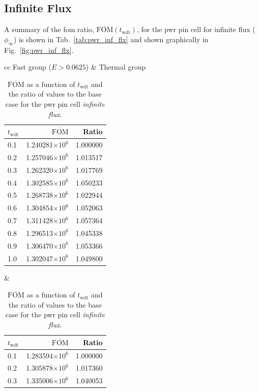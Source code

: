 \subsection{Infinite Flux}
A summary of the \gls{fom} ratio,
$\overline{\mathrm{FOM}}(t_{\mathrm{wdt}})$, for the \gls{pwr} pin
cell for infinite flux ($\phi_{\infty}$) is shown in Tab.~\ref{tab:pwr_inf_flx} and
shown graphically in Fig.~\ref{fig:pwr_inf_flx}.
\begin{table}[hbtp]
  \centering
  \caption[$\overline{\mathrm{FOM}}$ and ratio for
    the \acrshort{pwr} pin cell infinite flux.]{$\overline{\mathrm{FOM}}$ as a function of
    $t_{\mathrm{wdt}}$ and the ratio of values to the base case for
    the \gls{pwr} pin cell \textit{infinite flux}.}
  \begin{tabular}{cc} Fast group ($E > 0.0625$) & Thermal group \\
\begin{tabular}{lrr}
\toprule
$t_{\mathrm{wdt}}$ &                   $\overline{\mathrm{FOM}}$ & Ratio\\
\midrule
 0.1 & 1.240281$\times 10^{6}$ & 1.000000 \\
 0.2 & 1.257046$\times 10^{6}$ & 1.013517 \\
 0.3 & 1.262320$\times 10^{6}$ & 1.017769 \\
 0.4 & 1.302585$\times 10^{6}$ & 1.050233 \\
 0.5 & 1.268738$\times 10^{6}$ & 1.022944 \\
 0.6 & 1.304854$\times 10^{6}$ & 1.052063 \\
 0.7 & 1.311428$\times 10^{6}$ & 1.057364 \\
 0.8 & 1.296513$\times 10^{6}$ & 1.045338 \\
 0.9 & 1.306470$\times 10^{6}$ & 1.053366 \\
 1.0 & 1.302047$\times 10^{6}$ & 1.049800 \\
\bottomrule
\end{tabular} &
\begin{tabular}{lrr}
\toprule
$t_{\mathrm{wdt}}$ &                   $\overline{\mathrm{FOM}}$ &
                                                                   Ratio\\
\midrule
 0.1 & 1.283594$\times 10^{6}$ & 1.000000 \\
 0.2 & 1.305878$\times 10^{6}$ & 1.017360 \\
 0.3 & 1.335006$\times 10^{6}$ & 1.040053 \\

\end{tabular}
\end{tabular}
\end{table}
